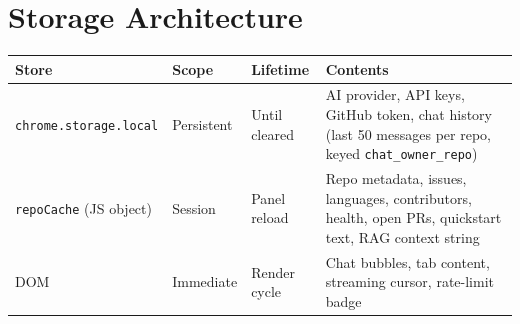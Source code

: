 \documentclass[11pt,a4paper]{article}
\begin{document}
\section{Storage Architecture}

\begin{longtable}{L{3.5cm} L{2.5cm} L{2.5cm} L{5cm}}
    \toprule
    \textbf{Store} & \textbf{Scope} & \textbf{Lifetime} & \textbf{Contents} \\
    \midrule
    \endhead
    \bottomrule
    \endfoot

    \texttt{chrome.storage.local} & Persistent & Until cleared & AI provider, API keys, GitHub token, chat history (last 50 messages per repo, keyed \texttt{chat\_owner\_repo}) \\
    \addlinespace
    \texttt{repoCache} (JS object) & Session & Panel reload & Repo metadata, issues, languages, contributors, health, open PRs, quickstart text, RAG context string \\
    \addlinespace
    DOM & Immediate & Render cycle & Chat bubbles, tab content, streaming cursor, rate-limit badge \\
\end{longtable}

\end{document}
